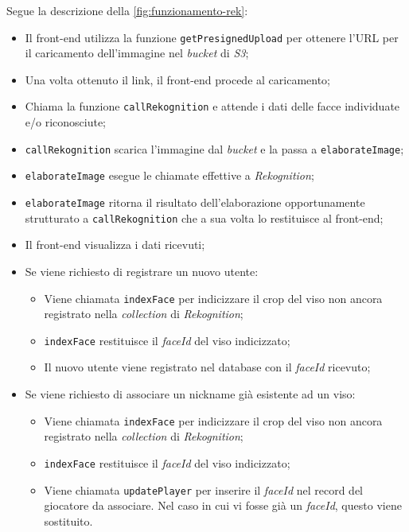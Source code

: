 	Segue la descrizione della \autoref{fig:funzionamento-rek}:
	\begin{itemize}
		\item Il front-end utilizza la funzione \texttt{getPresignedUpload} per ottenere l'URL per il caricamento dell'immagine nel \emph{bucket} di \emph{S3};
		\item Una volta ottenuto il link, il front-end procede al caricamento;
		\item Chiama la funzione \texttt{callRekognition} e attende i dati delle facce individuate e/o riconosciute;
		\item \texttt{callRekognition} scarica l'immagine dal \emph{bucket} e la passa a \texttt{elaborateImage};
		\item \texttt{elaborateImage} esegue le chiamate effettive a \emph{Rekognition};
		\item \texttt{elaborateImage} ritorna il risultato dell'elaborazione opportunamente strutturato a \texttt{callRekognition} che a sua volta lo restituisce al front-end;
		\item Il front-end visualizza i dati ricevuti;
		
		\item Se viene richiesto di registrare un nuovo utente:
		\begin{itemize}
			\item Viene chiamata \texttt{indexFace} per indicizzare il crop del viso non ancora registrato nella \emph{collection} di \emph{Rekognition};
			\item \texttt{indexFace} restituisce il \emph{faceId} del viso indicizzato; 
			\item Il nuovo utente viene registrato nel database con il \emph{faceId} ricevuto;
		\end{itemize}
		
		\item Se viene richiesto di associare un nickname già esistente ad un viso:
		\begin{itemize}
				\item Viene chiamata \texttt{indexFace} per indicizzare il crop del viso non ancora registrato nella \emph{collection} di \emph{Rekognition};
			\item \texttt{indexFace} restituisce il \emph{faceId} del viso indicizzato; 
			\item Viene chiamata \texttt{updatePlayer} per inserire il \emph{faceId} nel record del giocatore da associare. Nel caso in cui vi fosse già un \emph{faceId}, questo viene sostituito.
		\end{itemize}
		
	\end{itemize}
	
